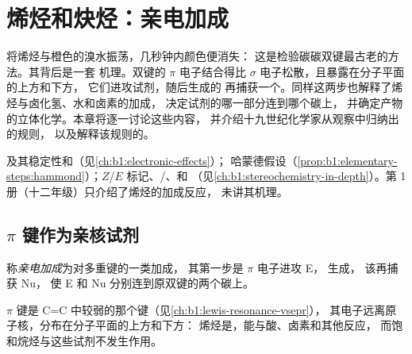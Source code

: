 \chapter{烯烃和炔烃：亲电加成}\label{ch:b1:electrophilic-additions}

将烯烃与橙色的溴水振荡，几秒钟内颜色便消失：
这是检验碳碳双键最古老的方法。其背后是一套
机理。双键的 $\pi$ 电子结合得比
$\sigma$ 电子松散，且暴露在分子平面的上方和下方，
它们进攻试剂，随后生成的
再捕获一个。同样这两步也解释了烯烃与卤化氢、水和卤素的加成，
决定试剂的哪一部分连到哪个碳上，
并确定产物的立体化学。本章将逐一讨论这些内容，
并介绍十九世纪化学家从观察中归纳出的规则，
以及解释该规则的。

\begin{recall}
及其稳定性和（见\cref{ch:b1:electronic-effects}）；
哈蒙德假设（\cref{prop:b1:elementary-steps:hammond}）；$Z$/$E$
标记、/、和
（见\cref{ch:b1:stereochemistry-in-depth}）。第 1 册（十二年级）只介绍了烯烃的加成反应，
未讲其机理。
\end{recall}

\section{\texorpdfstring{$\pi$}{pi} 键作为亲核试剂}

\begin{definition}[亲电加成]\label{def:b1:electrophilic-additions:electrophilic-addition}
称\emph{亲电加成}为对多重键的一类加成，
其第一步是 $\pi$ 电子进攻 E，
生成，
该再捕获 Nu，
使 E 和 Nu 分别连到原双键的两个碳上。
\end{definition}

$\pi$ 键是 C=C 中较弱的那个键（见\cref{ch:b1:lewis-resonance-vsepr}），
其电子远离原子核，分布在分子平面的上方和下方：
烯烃是，能与酸、卤素和其他反应，
而饱和烷烃与这些试剂不发生作用。


